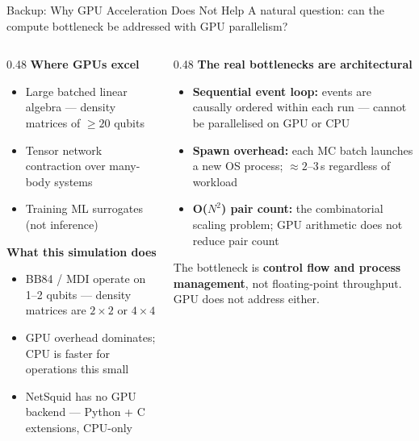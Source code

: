 \documentclass[10pt]{beamer}
\begin{document}
\begin{frame}{Backup: Why GPU Acceleration Does Not Help}
    \small A natural question: can the compute bottleneck be addressed with GPU parallelism?

    \vspace{0.2cm}
    \begin{columns}[T]
        \begin{column}{0.48\textwidth}
            \textbf{Where GPUs excel}
            \begin{itemize}\scriptsize
                \item Large batched linear algebra — density matrices of ${\geq}20$ qubits
                \item Tensor network contraction over many-body systems
                \item Training ML surrogates (not inference)
            \end{itemize}

            \vspace{0.2cm}
            \textbf{What this simulation does}
            \begin{itemize}\scriptsize
                \item BB84 / MDI operate on 1--2 qubits — density matrices are $2\times2$ or $4\times4$
                \item GPU overhead dominates; CPU is faster for operations this small
                \item NetSquid has no GPU backend — Python + C extensions, CPU-only
            \end{itemize}
        \end{column}
        \begin{column}{0.48\textwidth}
            \textbf{The real bottlenecks are architectural}
            \begin{itemize}\scriptsize
                \item \textbf{Sequential event loop:} events are causally ordered within each run —
                      cannot be parallelised on GPU or CPU
                \item \textbf{Spawn overhead:} each MC batch launches a new OS process;
                      ${\approx}2$--$3$\,s regardless of workload
                \item \textbf{O($N^2$) pair count:} the combinatorial scaling problem;
                      GPU arithmetic does not reduce pair count
            \end{itemize}

            \vspace{0.2cm}
            \begin{alertblock}{}
                \scriptsize The bottleneck is \textbf{control flow and process management},
                not floating-point throughput. GPU does not address either.
            \end{alertblock}
        \end{column}
    \end{columns}
\end{frame}
\end{document}
